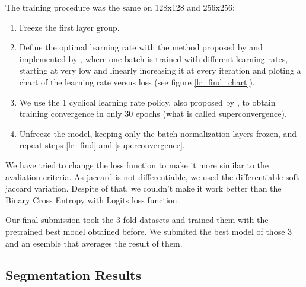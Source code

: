 \documentclass[conference]{IEEEtran}
\begin{document}
The training procedure was the same on 128x128 and 256x256:
\begin{enumerate}
  \item Freeze the first layer group.
  \item \label{lr_find}Define the optimal learning rate with the method proposed by \cite{leslie} and implemented by \cite{fastai}, where one batch is trained with different learning rates, starting at very low and linearly increasing it at every iteration and ploting a chart of the learning rate versus loss (see figure \ref{lr_find_chart}).
  \item \label{superconvergence}We use the 1 cyclical learning rate policy, also proposed by \cite{leslie}, to obtain training convergence in only 30 epochs (what is called superconvergence).
  \item Unfreeze the model, keeping only the batch normalization layers frozen, and repeat steps \ref{lr_find} and \ref{superconvergence}.
\end{enumerate}

We have tried to change the loss function to make it more similar to the avaliation criteria. As jaccard is not differentiable, we used the differentiable soft jaccard variation. Despite of that, we couldn't make it work better than the Binary Cross Entropy with Logits loss function. 

Our final submission took the 3-fold datasets and trained them with the pretrained best model obtained before. We submited the best model of those 3 and an esemble that averages the result of them. 

\subsection{Segmentation Results}
\end{document}
